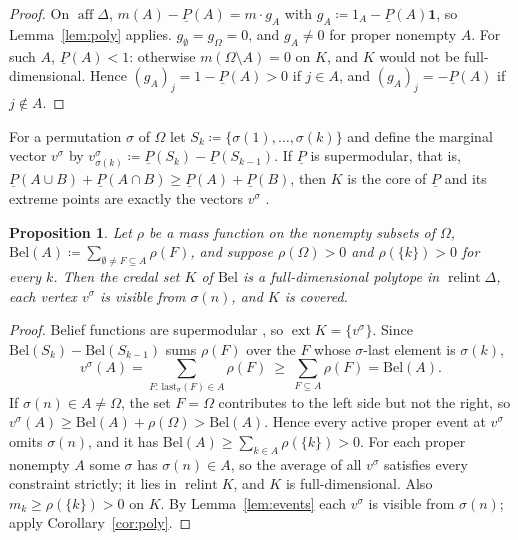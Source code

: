 \documentclass[11pt]{article}
\newcommand{\one}{\mathbf{1}}
\DeclareMathOperator{\relint}{relint}
\DeclareMathOperator{\aff}{aff}
\DeclareMathOperator{\ext}{ext}
\theoremstyle{plain}
\newtheorem{proposition}[theorem]{Proposition}
\theoremstyle{definition}
\theoremstyle{remark}
\begin{document}
\begin{proof}
On $\aff\Delta$, $m(A)-\underline P(A)=m\cdot g_A$ with $g_A\coloneqq1_A-\underline
P(A)\one$, so Lemma~\ref{lem:poly} applies. $g_\emptyset=g_\Omega=0$, and $g_A\neq0$ for
proper nonempty $A$. For such $A$, $\underline P(A)<1$: otherwise $m(\Omega\setminus A)=0$
on $K$, and $K$ would not be full-dimensional. Hence $(g_A)_j=1-\underline P(A)>0$ if
$j\in A$, and $(g_A)_j=-\underline P(A)$ if $j\notin A$.
\end{proof}

For a permutation $\sigma$ of $\Omega$ let $S_k\coloneqq\{\sigma(1),\dots,\sigma(k)\}$ and
define the marginal vector $v^\sigma$ by $v^\sigma_{\sigma(k)}\coloneqq\underline P(S_k)
-\underline P(S_{k-1})$. If $\underline P$ is supermodular, that is, $\underline P(A\cup
B)+\underline P(A\cap B)\ge\underline P(A)+\underline P(B)$, then $K$ is the core of
$\underline P$ and its extreme points are exactly the vectors $v^\sigma$
\cite{Shapley,Ichiishi}.

\begin{proposition}\label{prop:bel}
Let $\rho$ be a mass function on the nonempty subsets of $\Omega$, $\mathrm{Bel}(A)
\coloneqq\sum_{\emptyset\neq F\subseteq A}\rho(F)$, and suppose $\rho(\Omega)>0$ and
$\rho(\{k\})>0$ for every $k$. Then the credal set $K$ of $\mathrm{Bel}$ is a
full-dimensional polytope in $\relint\Delta$, each vertex $v^\sigma$ is visible from
$\sigma(n)$, and $K$ is covered.
\end{proposition}

\begin{proof}
Belief functions are supermodular \cite{Shafer}, so $\ext K=\{v^\sigma\}$. Since
$\mathrm{Bel}(S_k)-\mathrm{Bel}(S_{k-1})$ sums $\rho(F)$ over the $F$ whose
$\sigma$-last element is $\sigma(k)$,
\[
  v^\sigma(A)=\sum_{F:\,\mathrm{last}_\sigma(F)\in A}\rho(F)\ \ge\
  \sum_{F\subseteq A}\rho(F)=\mathrm{Bel}(A).
\]
If $\sigma(n)\in A\neq\Omega$, the set $F=\Omega$ contributes to the left side but not
the right, so $v^\sigma(A)\ge\mathrm{Bel}(A)+\rho(\Omega)>\mathrm{Bel}(A)$. Hence every
active proper event at $v^\sigma$ omits $\sigma(n)$, and it has $\mathrm{Bel}(A)\ge
\sum_{k\in A}\rho(\{k\})>0$. For each proper nonempty $A$ some $\sigma$ has $\sigma(n)
\in A$, so the average of all $v^\sigma$ satisfies every constraint strictly; it lies in
$\relint K$, and $K$ is full-dimensional. Also $m_k\ge\rho(\{k\})>0$ on $K$. By
Lemma~\ref{lem:events} each $v^\sigma$ is visible from $\sigma(n)$; apply
Corollary~\ref{cor:poly}.
\end{proof}
\end{document}
